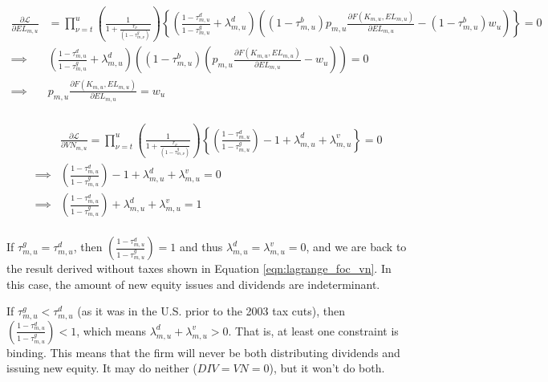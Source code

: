 \documentclass[letterpaper,12pt]{article}
\theoremstyle{definition}
\begin{document}
\begin{spacing}{1.5}
\begin{equation}
\label{eqn:lagrange_foc_l_tax}
\begin{split}
 \frac{\partial \mathcal{L}}{\partial EL_{m,u}} & =   \prod_{\nu=t}^{u} \left(\frac{1}{1+\frac{r_{\nu}}{(1-\tau^{g}_{m,\nu})}}\right) \left\{\left(\frac{1-\tau^{d}_{m,u}}{1-\tau^{g}_{m,u}} +  \lambda^{d}_{m,u} \right)\left((1-\tau^{b}_{m,u})p_{m,u}\frac{\partial F(K_{m,u},EL_{m,u})}{\partial EL_{m,u}} -(1-\tau^{b}_{m,u})w_{u} \right) \right\} = 0 \\
\implies & \left(\frac{1-\tau^{d}_{m,u}}{1-\tau^{g}_{m,u}} +  \lambda^{d}_{m,u} \right)\left((1-\tau^{b}_{m,u})\left(p_{m,u}\frac{\partial F(K_{m,u},EL_{m,u})}{\partial EL_{m,u}} -w_{u}\right) \right)   = 0 \\
\implies &   p_{m,u}\frac{\partial F(K_{m,u},EL_{m,u})}{\partial EL_{m,u}} = w_{u}  \\
\end{split}
\end{equation}


\begin{equation}
\label{eqn:lagrange_foc_vn_tax2}
\begin{split}
& \frac{\partial \mathcal{L}}{\partial VN_{m,u}} =   \prod_{\nu=t}^{u} \left(\frac{1}{1+\frac{r_{\nu}}{(1-\tau^{g}_{m,\nu})}}\right) \left\{\left(\frac{1-\tau^{d}_{m,u}}{1-\tau^{g}_{m,u}}\right) - 1 +\lambda^{d}_{m,u}  + \lambda^{v}_{m,u} \right\} = 0 \\
\implies & \left(\frac{1-\tau^{d}_{m,u}}{1-\tau^{g}_{m,u}}\right) - 1 +\lambda^{d}_{m,u}  + \lambda^{v}_{m,u} = 0 \\
\implies &  \left(\frac{1-\tau^{d}_{m,u}}{1-\tau^{g}_{m,u}}\right) +\lambda^{d}_{m,u}  + \lambda^{v}_{m,u} = 1  \\
\end{split}
\end{equation}

If $\tau^{g}_{m,u}=\tau^{d}_{m,u}$, then $ \left(\frac{1-\tau^{d}_{m,u}}{1-\tau^{g}_{m,u}}\right)=1$ and thus $\lambda^{d}_{m,u}= \lambda^{v}_{m,u}=0$, and we are back to the result derived without taxes shown in Equation \ref{eqn:lagrange_foc_vn}.  In this case, the amount of new equity issues and dividends are indeterminant.

If $\tau^{g}_{m,u}<\tau^{d}_{m,u}$ (as it was in the U.S. prior to the 2003 tax cuts), then $ \left(\frac{1-\tau^{d}_{m,u}}{1-\tau^{g}_{m,u}}\right)<1$, which means $ \lambda^{d}_{m,u} + \lambda^{v}_{m,u} >0$.  That is, at least one constraint is binding. This means that the firm will never be both distributing dividends and issuing new equity.  It may do neither ($DIV=VN=0$), but it won't do both.  


\end{spacing}
\end{document}
